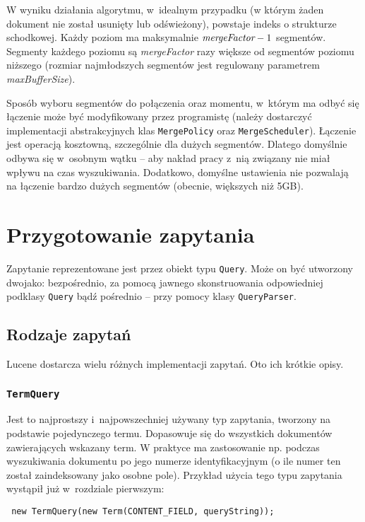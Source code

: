 W wyniku działania algorytmu, w~idealnym przypadku (w którym żaden dokument nie został usunięty lub odświeżony), powstaje indeks o strukturze schodkowej. Każdy poziom ma maksymalnie $\emph{mergeFactor} - 1$ segmentów. Segmenty każdego poziomu są \emph{mergeFactor} razy większe od segmentów poziomu niższego (rozmiar najmłodszych segmentów jest regulowany parametrem \emph{maxBufferSize}).

Sposób wyboru segmentów do połączenia oraz momentu, w~którym ma odbyć się łączenie może być modyfikowany przez programistę (należy dostarczyć implementacji abstrakcyjnych klas \texttt{MergePolicy} oraz \texttt{MergeScheduler}). Łączenie jest operacją kosztowną, szczególnie dla dużych segmentów. Dlatego domyślnie odbywa się w~osobnym wątku -- aby nakład pracy z~nią związany nie miał wpływu na czas wyszukiwania. Dodatkowo, domyślne ustawienia nie pozwalają na łączenie bardzo dużych segmentów (obecnie, większych niż 5GB).

\section{Przygotowanie zapytania}

Zapytanie reprezentowane jest przez obiekt typu \texttt{Query}. Może on być utworzony dwojako: bezpośrednio, za pomocą jawnego skonstruowania odpowiedniej podklasy \texttt{Query} bądź pośrednio -- przy pomocy klasy \texttt{QueryParser}.

\subsection{Rodzaje zapytań}

Lucene dostarcza wielu różnych implementacji zapytań. Oto ich krótkie opisy.

\subsubsection{\texttt{TermQuery}}

Jest to najprostszy i~najpowszechniej używany typ zapytania, tworzony na podstawie pojedynczego termu. Dopasowuje się do wszystkich dokumentów zawierających wskazany term. W praktyce ma zastosowanie np. podczas wyszukiwania dokumentu po jego numerze identyfikacyjnym (o ile numer ten został zaindeksowany jako osobne pole). Przykład użycia tego typu zapytania wystąpił już w~rozdziale pierwszym:

\begin{lstlisting}
 new TermQuery(new Term(CONTENT_FIELD, queryString));
\end{lstlisting}

